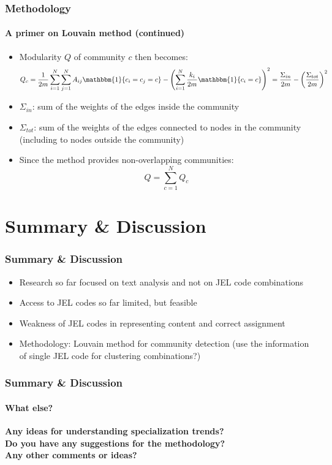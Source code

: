 \documentclass[aspectratio=1610]{beamer}
\begin{document}
\begin{frame}
	\frametitle{Methodology}
	\framesubtitle{A primer on Louvain method (continued)}
	\begin{itemize}
		\item Modularity $Q$ of community $c$ then becomes:
		\begin{equation}
			Q_c = \frac{1}{2m} \sum_{i=1}^N \sum_{j=1}^N  A_{ij} \mathbbm{1}{c_i = c_j = c} - \left(\sum_{i=1}^N \frac{k_i }{2m} \mathbbm{1}{c_i = c} \right)^2
			= \frac{\Sigma_{in}}{2m} - \left(\frac{\Sigma_{tot}}{2m}\right)^2
		\end{equation}
		\item $\Sigma_{in}$: sum of the weights of the edges inside the community
		\item $\Sigma_{tot}$: sum of the weights of the edges connected to nodes in the community (including to nodes outside the community)
		\item Since the method provides non-overlapping communities:
		\begin{equation}
			Q = \sum_{c=1}^N Q_c
		\end{equation}
	\end{itemize}
\end{frame}

\section{Summary \& Discussion}

\begin{frame}
	\frametitle{Summary \& Discussion}
	\begin{itemize}
		\item Research so far focused on text analysis and not on JEL code combinations
		\item Access to JEL codes so far limited, but feasible
		\item Weakness of JEL codes in representing content and correct assignment
		\item Methodology: Louvain method for community detection (use the information of single JEL code for clustering combinations?)
	\end{itemize}
\end{frame}

\begin{frame}
	\frametitle{Summary \& Discussion}
	\framesubtitle{What else?}

	\begin{center}
		\textbf{Any ideas for understanding specialization trends?\\
		Do you have any suggestions for the methodology?\\
		Any other comments or ideas?}
	\end{center}
\end{frame}
\end{document}

